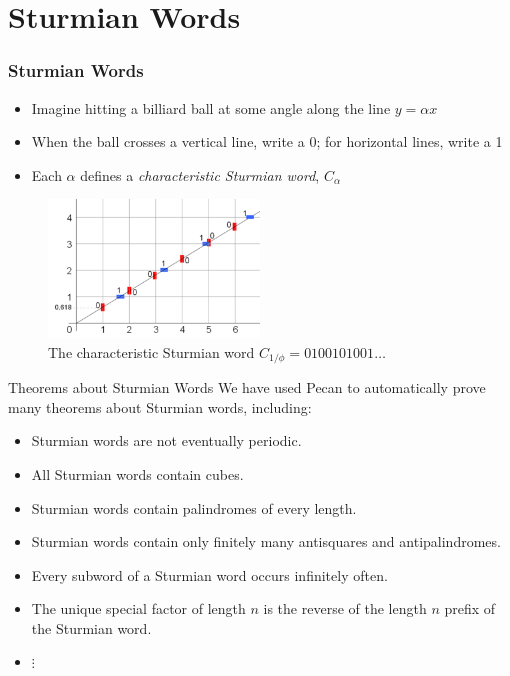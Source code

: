 \documentclass[leqno,presentation,usenames,dvipsnames]{beamer}
\begin{document}
\section{Sturmian Words}

\begin{frame}
    \frametitle{Sturmian Words}
    
    \begin{itemize}
        \item Imagine hitting a billiard ball at some angle along the line $y = \alpha x$
        \item When the ball crosses a vertical line, write a 0; for horizontal lines, write a 1
        \item Each $\alpha$ defines a \emph{characteristic Sturmian word}, $C_{\alpha}$
    \end{itemize}
    
\begin{figure}
    \centering
    \includegraphics[width=0.5\textwidth]{images/Fibonacci_word_cutting_sequence.png}
    \caption{The characteristic Sturmian word $C_{1/\phi} = 0100101001\ldots$}
\end{figure}
\end{frame}

\begin{frame}{Theorems about Sturmian Words}
    We have used Pecan to automatically prove many theorems about Sturmian words, including:
    \begin{itemize}
        \item Sturmian words are not eventually periodic.
        \item All Sturmian words contain cubes.
        \item Sturmian words contain palindromes of every length.
        \item Sturmian words contain only finitely many antisquares and antipalindromes.
        \item Every subword of a Sturmian word occurs infinitely often.
        \item The unique special factor of length $n$ is the reverse of the length $n$ prefix of the Sturmian word.
        \item $\vdots$
    \end{itemize}
\end{frame}
\end{document}
